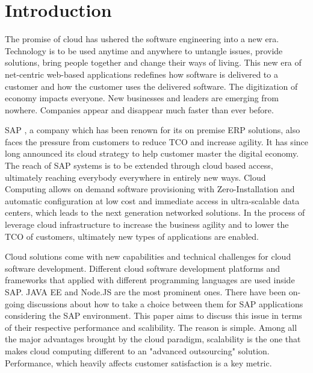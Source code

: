 \chapter{Introduction}
The promise of cloud has ushered the software engineering into a new era. Technology is to be used anytime and anywhere to untangle issues, provide solutions, bring people together and change their ways of living. This new era of net-centric web-based applications redefines how software is delivered to a customer and how the customer uses the delivered software. The digitization of economy impacts everyone. New businesses and leaders are emerging from nowhere. Companies appear and disappear much faster than ever before. 

SAP , a company which has been renown for its on premise ERP solutions, also faces the pressure from customers to reduce TCO and increase agility. It has since long announced its cloud strategy to help customer master the digital economy. The reach of SAP systems is to be extended through cloud based access, ultimately reaching everybody everywhere in entirely new ways. Cloud Computing allows on demand software provisioning with Zero-Installation and automatic configuration at low cost and immediate access in ultra-scalable data centers, which leads to the next generation networked solutions. In the process of leverage cloud infrastructure to increase the business agility and to lower the TCO of customers, ultimately new types of applications are enabled.

Cloud solutions come with new capabilities and technical challenges for cloud software development.  Different cloud software development platforms and frameworks that applied with different programming languages are used inside SAP. JAVA EE and Node.JS are the most prominent ones. There have been on-going discussions about how to  take a choice between them for SAP applications considering the SAP environment. This paper aims to discuss this issue in terms of their respective performance and scalibility. The reason is simple. Among all the major advantages brought by the cloud paradigm, scalability is the one that makes cloud computing different to an "advanced outsourcing" solution. Performance, which heavily affects customer satisfaction is a key metric. 



